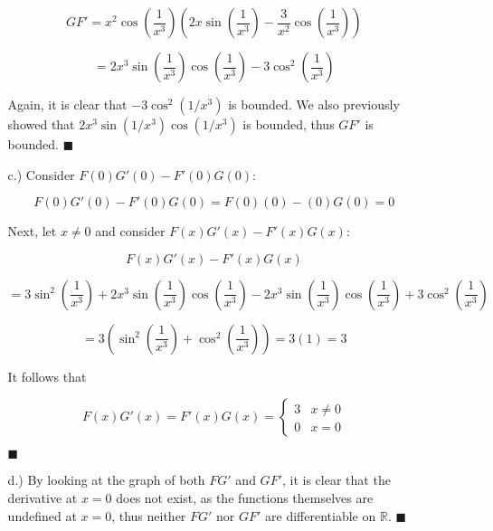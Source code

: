 \documentclass[11pt]{article}
\newcommand{\parens}[1]{\left(#1\right)}             %
\newcommand{\R}{\mathbb{R}}
\begin{document}
\begin{itemize}
\begin{itemize}
        \[GF'
        =x^2\cos\parens{\frac{1}{x^3}}
        \parens{2x\sin\parens{\frac{1}{x^3}}
        -\frac{3}{x^2}\cos\parens{\frac{1}{x^3}}}\]

        \[=2x^3\sin\parens{\frac{1}{x^3}}\cos\parens{\frac{1}{x^3}}-3\cos^2\parens{\frac{1}{x^3}}\]

        Again, it is clear that
        $-3\cos^2(1/x^3)$
        is bounded. We also previously showed that
        $2x^3\sin(1/x^3)\cos(1/x^3)$
        is bounded, thus $GF'$ is bounded. $\blacksquare$

        \pagebreak
        \item [c.)] Consider
        $F(0)G'(0)-F'(0)G(0)$:

        \[F(0)G'(0)-F'(0)G(0)=F(0)(0)-(0)G(0)=0\]

        Next, let
        $x\ne0$
        and consider
        $F(x)G'(x)-F'(x)G(x)$:

        \[F(x)G'(x)-F'(x)G(x)\]
        
        \[=3\sin^2\parens{\frac{1}{x^3}}
        +2x^3\sin\parens{\frac{1}{x^3}}\cos\parens{\frac{1}{x^3}}
        -2x^3\sin\parens{\frac{1}{x^3}}\cos\parens{\frac{1}{x^3}}
        +3\cos^2\parens{\frac{1}{x^3}}
        \]

        \[=3\parens{\sin^2\parens{\frac{1}{x^3}}+\cos^2\parens{\frac{1}{x^3}}}=3(1)=3\]
        
        It follows that

        \[F(x)G'(x)=F'(x)G(x)=\begin{cases}
            3 & x\ne0 \\
            0 & x=0
        \end{cases}\]

        $\blacksquare$

        \item [d.)] By looking at the graph of both
        $FG'$
        and
        $GF'$,
        it is clear that the derivative at
        $x=0$
        does not exist,
        as the functions themselves are undefined at
        $x=0$,
        thus neither
        $FG'$
        nor
        $GF'$
        are differentiable on
        $\R$.
        $\blacksquare$
    \end{itemize}
\end{itemize}
\end{document}
